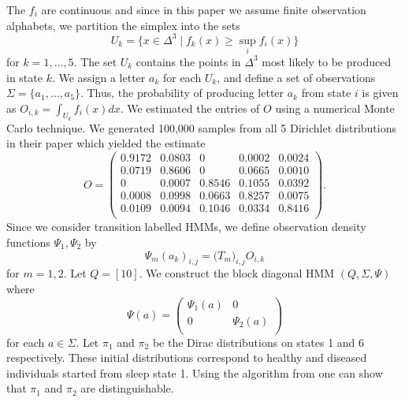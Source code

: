 \documentclass[a4paper,UKenglish,cleveref, autoref,mathscr]{lipics-v2019}
\newcommand{\1}{\mathbbm{1}}
\begin{document}
\begin{example}
The $f_i$ are continuous and since in this paper we assume finite observation alphabets, we partition the simplex into the sets
\begin{equation*}
U_k = \{x \in \Delta^3 \mid f_k(x) \geq \sup_{i} f_i(x)\}
\end{equation*}
for $k = 1, \dots, 5$. The set $U_k$ contains the points in $\Delta^3$ most likely to be produced in state $k$. We assign a letter $a_k$ for each $U_k$, and define a set of observations $\Sigma = \{a_1, \dots, a_5\}$. Thus, the probability of producing letter $a_k$ from state $i$ is given as $O_{i,k} = \int_{U_k} f_i(x) dx$. We estimated the entries of $O$ using a numerical Monte Carlo technique. We generated 100,000 samples from all 5 Dirichlet distributions in their paper which yielded the estimate
\begin{equation*}
O = \begin{pmatrix}
0.9172&0.0803&0&0.0002&0.0024\\
0.0719&0.8606&0&0.0665&0.0010\\
0&0.0007&0.8546&0.1055&0.0392\\
0.0008&0.0998&0.0663&0.8257&0.0075\\
0.0109&0.0094&0.1046&0.0334&0.8416\\
\end{pmatrix}.
\end{equation*}
Since we consider transition labelled HMMs, we define observation density functions $\Psi_1, \Psi_2$ by
\begin{equation*}
\Psi_m(a_k)_{i,j} = \big( T_m \big)_{i,j} O_{i,k}
\end{equation*}
for $m = 1, 2$. Let $Q = [10]$. We construct the block diagonal HMM $(Q, \Sigma, \Psi)$ where
\begin{equation*}
\Psi(a) = \begin{pmatrix}
\Psi_1(a) & 0 \\
0 & \Psi_2(a) \\
\end{pmatrix}
\end{equation*}
for each $a \in \Sigma$. Let $\pi_1$ and $\pi_2$ be the Dirac distributions on states 1 and 6 respectively. These initial distributions correspond to healthy and diseased individuals started from sleep state 1. Using the algorithm from \cite{kief14} one can show that $\pi_1$ and $\pi_2$ are distinguishable.


\end{example}
\end{document}
